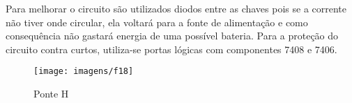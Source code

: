 Para melhorar o circuito são utilizados diodos entre as chaves pois se a corrente não tiver onde circular, ela voltará para a fonte de alimentação e como consequência não gastará energia de uma possível bateria. Para a proteção do circuito contra curtos, utiliza-se portas lógicas com componentes 7408 e 7406. 

\begin{figure}[ht!]
    \center 
    \texttt{[image: imagens/f18]}
    \caption{Ponte H}
\end{figure}

